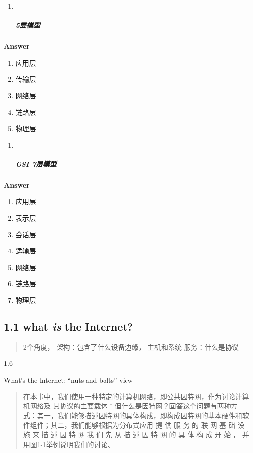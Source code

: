 \documentclass[
]{article}
\begin{document}
\begin{enumerate}
\def\labelenumi{\arabic{enumi}.}
\item ~
  \hypertarget{5ux5c42ux6a21ux578b}{%
  \subparagraph{5层模型}\label{5ux5c42ux6a21ux578b}}
\end{enumerate}

\textbf{Answer}

\begin{enumerate}
\def\labelenumi{\arabic{enumi}.}
\item
  应用层
\item
  传输层
\item
  网络层
\item
  链路层
\item
  物理层
\end{enumerate}

\begin{enumerate}
\def\labelenumi{\arabic{enumi}.}
\item ~
  \hypertarget{osi-7ux5c42ux6a21ux578b}{%
  \subparagraph{OSI 7层模型}\label{osi-7ux5c42ux6a21ux578b}}
\end{enumerate}

\textbf{Answer}

\begin{enumerate}
\def\labelenumi{\arabic{enumi}.}
\item
  应用层
\item
  表示层
\item
  会话层
\item
  运输层
\item
  网络层
\item
  链路层
\item
  物理层
\end{enumerate}

\hypertarget{11-what-is-the-internet}{%
\subsection{\texorpdfstring{1.1 what \emph{is} the
Internet?}{1.1 what is the Internet?}}\label{11-what-is-the-internet}}

\begin{quote}
2个角度， 架构：包含了什么设备边缘， 主机和系统 服务：什么是协议
\end{quote}

1.6

What's the Internet: ``nuts and bolts'' view

\begin{quote}
在本书中，我们使用一种特定的计算机网络，即公共因特网，作为讨论计算机网络及
其协议的主要载体：但什么是因特网？回答这个问题有两种方式：其一，我们能够描述因特网的具体构成，即构成因特网的基本硬件和软件组件；其二，我们能够根据为分布式应用
提 供 服 务 的 联 网 基 础 设 施 来 描 述 因 特 网 我 们 先 从 描 述 因
特 网 的 具 体 构 成 开 始 ， 并 用图1-1举例说明我们的讨论、
\end{quote}
\end{document}
